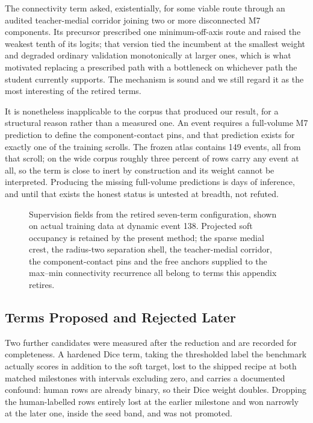 The connectivity term asked, existentially, for some viable route through an
audited teacher-medial corridor joining two or more disconnected M7 components.
Its precursor prescribed one minimum-off-axis route and raised the weakest
tenth of its logits; that version tied the incumbent at the smallest weight and
degraded ordinary validation monotonically at larger ones, which is what
motivated replacing a prescribed path with a bottleneck on whichever path the
student currently supports.
The mechanism is sound and we still regard it as the most interesting of the
retired terms.

It is nonetheless inapplicable to the corpus that produced our result, for a
structural reason rather than a measured one.
An event requires a full-volume M7 prediction to define the component-contact
pins, and that prediction exists for exactly one of the training scrolls.
The frozen atlas contains 149 events, all from that scroll; on the wide corpus
roughly three percent of rows carry any event at all, so the term is close to
inert by construction and its weight cannot be interpreted.
Producing the missing full-volume predictions is days of inference, and until
that exists the honest status is untested at breadth, not refuted.

\begin{figure}[t]
  \centering
  \caption{Supervision fields from the retired seven-term configuration, shown
  on actual training data at dynamic event 138. Projected soft occupancy is
  retained by the present method; the sparse medial crest, the radius-two
  separation shell, the teacher-medial corridor, the component-contact pins and
  the free anchors supplied to the max--min connectivity recurrence all belong
  to terms this appendix retires.}
  \label{fig:supervision}
\end{figure}

\subsection{Terms Proposed and Rejected Later}
\label{sec:also-later}

Two further candidates were measured after the reduction and are recorded for
completeness.
A hardened Dice term, taking the thresholded label the benchmark actually
scores in addition to the soft target, lost to the shipped recipe at both
matched milestones with intervals excluding zero, and carries a documented
confound: human rows are already binary, so their Dice weight doubles.
Dropping the human-labelled rows entirely lost at the earlier milestone and won
narrowly at the later one, inside the seed band, and was not promoted.

